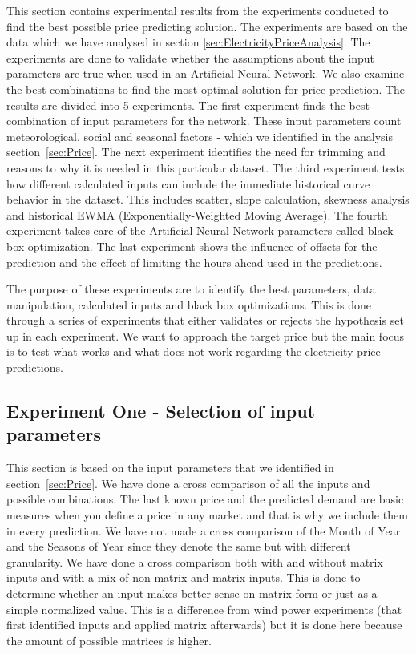 This section contains experimental results from the experiments conducted to find the best possible price predicting solution. The experiments are based on the data which we have analysed in section \ref{sec:ElectricityPriceAnalysis}. The experiments are done to validate whether the assumptions about the input parameters are true when used in an Artificial Neural Network. We also examine the best combinations to find the most optimal solution for price prediction. The results are divided into 5 experiments. The first experiment finds the best combination of input parameters for the network. These input parameters count meteorological, social and seasonal factors - which we identified in the analysis section~\ref{sec:Price}. The next experiment identifies the need for trimming and reasons to why it is needed in this particular dataset. The third experiment tests how different calculated inputs can include the immediate historical curve behavior in the dataset. This includes scatter, slope calculation, skewness analysis and historical EWMA (Exponentially-Weighted Moving Average). The fourth experiment takes care of the Artificial Neural Network parameters called black-box optimization. The last experiment shows the influence of offsets for the prediction and the effect of limiting the hours-ahead used in the predictions.

The purpose of these experiments are to identify the best parameters, data manipulation, calculated inputs and black box optimizations. This is done through a series of experiments that either validates or rejects the hypothesis set up in each experiment. We want to approach the target price but the main focus is to test what works and what does not work regarding the electricity price predictions.

\subsection{Experiment One - Selection of input parameters}
\label{sec:priceExperimentOne}
This section is based on the input parameters that we identified in section~\ref{sec:Price}. We have done a cross comparison of all the inputs and possible combinations. The last known price and the predicted demand are basic measures when you define a price in any market and that is why we include them in every prediction. We have not made a cross comparison of the Month of Year and the Seasons of Year since they denote the same but with different granularity. We have done a cross comparison both with and without matrix inputs and with a mix of non-matrix and matrix inputs. This is done to determine whether an input makes better sense on matrix form or just as a simple normalized value. This is a difference from wind power experiments (that first identified inputs and applied matrix afterwards) but it is done here because the amount of possible matrices is higher. 

